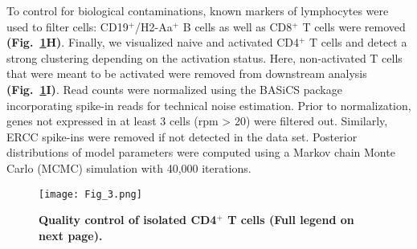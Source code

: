To control for biological contaminations, known markers of lymphocytes were used to filter cells: CD19$^+$/H2-Aa$^+$ B cells as well as CD8$^+$ T cells were removed \textbf{(Fig.~\ref{fig1:QC}H)}. Finally, we visualized naive and activated CD4$^+$ T cells and detect a strong clustering depending on the activation status. Here, non-activated T cells that were meant to be activated were removed from downstream analysis \textbf{(Fig.~\ref{fig1:QC}I)}. Read counts were normalized using the BASiCS package \citep{Vallejos2015} incorporating spike-in reads for technical noise estimation. Prior to normalization, genes not expressed in at least 3 cells (rpm > 20) were filtered out. Similarly, ERCC spike-ins were removed if not detected in the data set. Posterior distributions of model parameters were computed using a Markov chain Monte Carlo (MCMC) simulation with 40,000 iterations.   

\newpage

\begin{figure}[!hb]
\centering
\texttt{[image: Fig\_3.png]}
\caption[Quality control of isolated CD4$^+$ T cells]{\textbf{Quality control of isolated CD4$^+$ T cells (Full legend on next page).}\\}
\label{fig1:QC}
\end{figure}

\newpage

